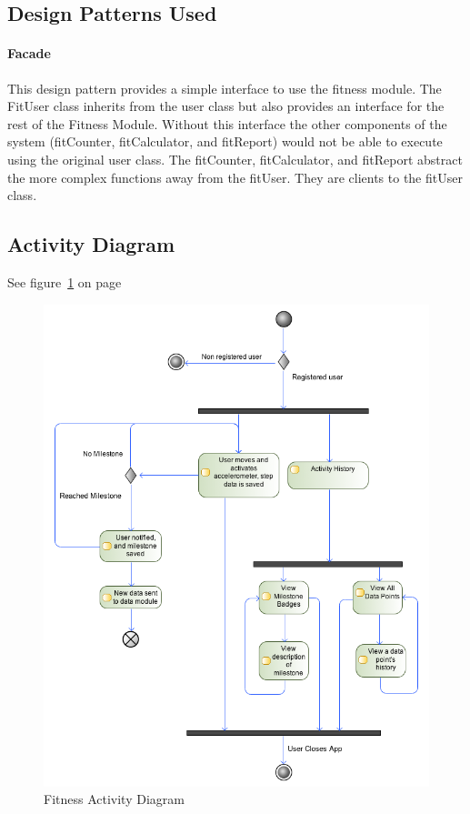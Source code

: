 \subsection{Design Patterns Used}
\paragraph{Facade}
This design pattern provides a simple interface to use the fitness module. The FitUser class inherits from the user class but also provides an interface for the rest of the Fitness Module. Without this interface the other components of the system (fitCounter, fitCalculator, and fitReport) would not be able to execute using the original user class. The fitCounter, fitCalculator, and fitReport abstract the more complex functions away from the fitUser. They are clients to the fitUser class.

\subsection{Activity Diagram}
See figure~\ref{fig:fitness_activity_diagram} on page~\pageref{fig:fitness_activity_diagram}
\begin{figure}
	\centering
	\includegraphics[scale=0.54]{Fitness/fitness_activity_diagram.png}
	\caption{Fitness Activity Diagram}
	\label{fig:fitness_activity_diagram}
\end{figure}

